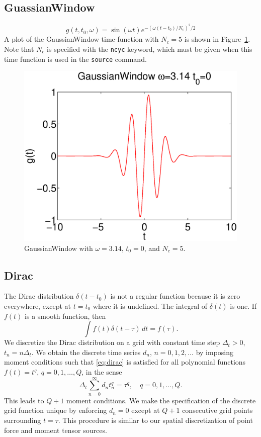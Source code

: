 \documentclass[11pt]{report}
\begin{document}
\subsection{GuassianWindow}
\[
g(t,t_0,\omega) = \sin(\omega t) e^{-(\omega(t-t_0)/N_c)^2/2}
\]
A plot of the GaussianWindow time-function with $N_c=5$ is shown in
Figure~\ref{fig:gaussianwindow}. Note that $N_c$ is specified with the \verb+ncyc+ keyword, which
must be given when this time function is used in the \verb+source+ command.
\begin{figure}
\begin{centering}
  \includegraphics[width=0.6\linewidth]{GW.eps}
  \caption{GaussianWindow with $\omega=3.14$, $t_0=0$, and $N_c=5$.}
  \label{fig:gaussianwindow}
\end{centering}
\end{figure}  

\subsection{Dirac}
The Dirac distribution $\delta(t-t_0)$ is not a regular function because it is zero everywhere,
except at $t=t_0$ where it is undefined. The integral of $\delta(t)$ is one. If $f(t)$ is a smooth
function, then
\begin{equation}\label{eq:dirac}
\int f(t)\delta(t-\tau)\, dt = f(\tau).
\end{equation}
We discretize the Dirac distribution on a grid with constant time step $\Delta_t>0$, $t_n =
n\Delta_t$. We obtain the discrete time series $d_n$, $n=0,1,2,\ldots$ by imposing moment conditions
such that \eqref{eq:dirac} is satisfied for all polynomial functions $f(t)=t^q$, $q=0,1,\ldots,Q$,
in the sense
\[
\Delta_t \sum_{n=0}^\infty d_n t_n^q = \tau^q,\quad q=0,1,\ldots,Q. 
\]
This leads to $Q+1$ moment conditions. We make the specification of the discrete grid function unique
by enforcing $d_n=0$ except at $Q+1$ consecutive grid points surrounding $t=\tau$. This procedure is
similar to our spatial discretization of point force and moment tensor sources.
\end{document}
